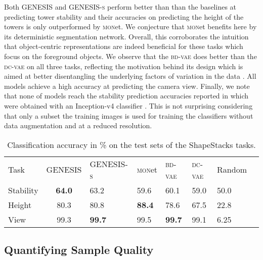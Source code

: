 \documentclass{article}
\begin{document}
\clearpage

Both \gls{GENESIS} and \gls{GENESIS}\textsc{-s} perform better than than the baselines at predicting tower stability and their accuracies on predicting the height of the towers is only outperformed by \textsc{mon}et.
We conjecture that \textsc{mon}et benefits here by its deterministic segmentation network.
Overall, this corroborates the intuition that object-centric representations are indeed beneficial for these tasks which focus on the foreground objects.
We observe that the \textsc{bd-vae} does better than the \textsc{dc-vae} on all three tasks, reflecting the motivation behind its design which is aimed at better disentangling the underlying factors of variation in the data \citep{watters2019spatial}.
All models achieve a high accuracy at predicting the camera view.
Finally, we note that none of models reach the stability prediction accuracies reported in \citet{groth2018shapestacks} which were obtained with an Inception-v4 classifier \citep{szegedy2017inception}.
This is not surprising considering that only a subset the training images is used for training the classifiers without data augmentation and at a reduced resolution.

\begin{table}[h!]
    \centering
    \caption{Classification accuracy in \% on the test sets of the ShapeStacks tasks.}
    \label{tab:semisupervised}
    \begin{tabularx}{0.85\textwidth}{l c*{6}{Y}}
        \toprule
        Task & \gls{GENESIS} & \mbox{\gls{GENESIS}\textsc{-s}} & \textsc{mon}et & \textsc{bd-vae} & \textsc{dc-vae} & Random \\
        \cmidrule(r){1-1} \cmidrule(rl){2-4} \cmidrule(rl){5-6} \cmidrule(r){7-7}
        Stability & \textbf{64.0} & 63.2          & 59.6          & 60.1          & 59.0 & 50.0 \\
        Height    & 80.3          & 80.8          & \textbf{88.4} & 78.6          & 67.5 & 22.8 \\
        View      & 99.3          & \textbf{99.7} & 99.5          & \textbf{99.7} & 99.1 & 6.25 \\
        \bottomrule
    \end{tabularx}
\end{table}






\subsection{Quantifying Sample Quality}
\label{sec:vae}
\end{document}
